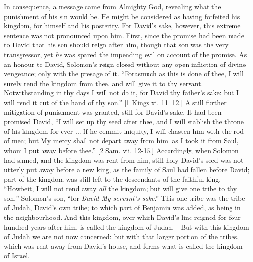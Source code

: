 In consequence, a message came from Almighty God, revealing what
the punishment of his sin would be. He might be considered as having
forfeited his kingdom, for himself and his posterity. For David's
sake, however, this extreme sentence was not pronounced upon him.
First, since the promise had been made to David that his son should
reign after him, though that son was the very transgressor, yet \emph{he}
was spared the impending evil on account of the promise. As an honour
to David, Solomon's reign closed without any open infliction of
divine vengeance; only with the presage of it. ``Forasmuch as this
is done of thee, I will surely rend the kingdom from thee, and will
give it to thy servant. Notwithstanding in thy days I will not do it,
for David thy father's sake: but I will rend it out of the hand of
thy son.'' [1 Kings xi. 11, 12.] A still further mitigation of
punishment was granted, still for David's sake. It had been promised
David, ``I will set up thy seed after thee, and I will stablish
the throne of his kingdom for ever ... If he commit iniquity, I will
chasten him with the rod of men; but My mercy shall not depart away
from him, as I took it from Saul, whom I put away before thee.''
[2 Sam. vii. 12-15.] Accordingly, when Solomon had sinned, and the
kingdom was rent from him, still holy David's seed was not utterly
put away before a new king, as the family of Saul had fallen before
David; part of the kingdom was still left to the descendants of the
faithful king. ``Howbeit, I will not rend away \emph{all} the
kingdom; but will give one tribe to thy son,'' Solomon's son,
``for \emph{David My servant's sake}.'' This one tribe was the
tribe of Judah, David's own tribe; to which part of Benjamin was
added, as being in the neighbourhood. And this kingdom, over which
David's line reigned for four hundred years after him, is called the
kingdom of Judah.—But with this kingdom of Judah we are not now
concerned; but with that larger portion of the tribes, which was rent
away from David's house, and forms what is called the kingdom of
Israel.

